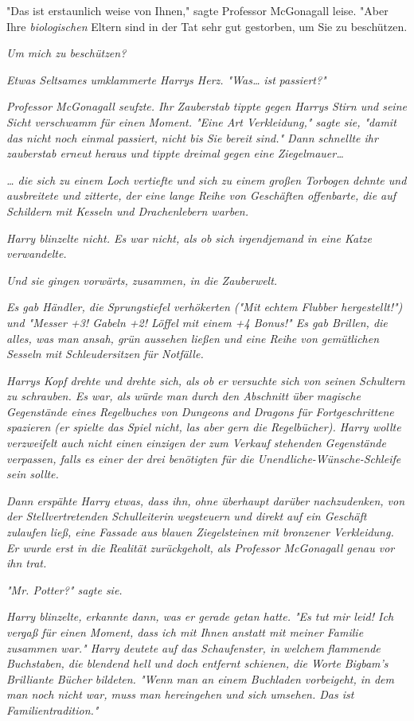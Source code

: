 {"Das ist erstaunlich weise von Ihnen," sagte Professor McGonagall leise. "Aber Ihre \emph{biologischen} Eltern sind in der Tat sehr gut gestorben, um Sie zu beschützen.

\emph{Um mich zu beschützen?}

\emph{Etwas Seltsames umklammerte Harrys Herz. "Was…} \emph{\emph{ist}} \emph{passiert?"}

\emph{Professor McGonagall seufzte. Ihr Zauberstab tippte gegen Harrys Stirn und seine Sicht verschwamm für einen Moment. "Eine Art Verkleidung," sagte sie, "damit das nicht noch einmal passiert, nicht bis Sie bereit sind." Dann schnellte ihr zauberstab erneut heraus und tippte dreimal gegen eine Ziegelmauer…}

\emph{… die sich zu einem Loch vertiefte und sich zu einem großen Torbogen dehnte und ausbreitete und zitterte, der eine lange Reihe von Geschäften offenbarte, die auf Schildern mit Kesseln und Drachenlebern warben.}

\emph{Harry blinzelte nicht. Es war nicht, als ob sich irgendjemand in eine Katze verwandelte.}

\emph{Und sie gingen vorwärts, zusammen, in die Zauberwelt.}

\emph{Es gab Händler, die Sprungstiefel verhökerten ("Mit echtem Flubber hergestellt!") und "Messer +3! Gabeln +2! Löffel mit einem +4 Bonus!" Es gab Brillen, die alles, was man ansah, grün aussehen ließen und eine Reihe von gemütlichen Sesseln mit Schleudersitzen für Notfälle.}

\emph{Harrys Kopf drehte und drehte sich, als ob er versuchte sich von seinen Schultern zu schrauben. Es war, als würde man durch den Abschnitt über magische Gegenstände eines Regelbuches von} \emph{\emph{Dungeons and Dragons für Fortgeschrittene}} \emph{spazieren (er spielte das Spiel nicht, las aber gern die Regelbücher). Harry wollte verzweifelt auch nicht einen einzigen der zum Verkauf stehenden Gegenstände verpassen, falls es einer der drei benötigten für die} \emph{Unendliche-Wünsche-Schleife} \emph{sein sollte.}

\emph{Dann erspähte Harry etwas, dass ihn, ohne überhaupt darüber nachzudenken, von der Stellvertretenden Schulleiterin wegsteuern und direkt auf ein Geschäft zulaufen ließ, eine Fassade aus blauen Ziegelsteinen mit bronzener Verkleidung. Er wurde erst in die Realität zurückgeholt, als Professor McGonagall genau vor ihn trat.}

\emph{"Mr. Potter?" sagte sie.}

\emph{Harry blinzelte, erkannte dann, was er gerade getan hatte. "Es tut mir leid! Ich vergaß für einen Moment, dass ich mit Ihnen anstatt mit meiner Familie zusammen war." Harry deutete auf das Schaufenster, in welchem} \emph{flammende Buchstaben, die blendend hell und doch entfernt schienen, die Worte} \emph{\emph{Bigbam's Brilliante Bücher}} \emph{bildeten. "Wenn man an einem Buchladen vorbeigeht, in dem man noch nicht war, muss man hereingehen und sich umsehen. Das ist Familientradition."}

}
